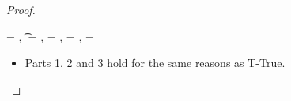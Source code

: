 \begin{lemma}
\begin{enumerate}
\begin{proof}
\begin{case}[T-Subsume]

\end{case}

\begin{case}[T-Const]\e{} = {\const{}},
  \t{} = {\constanttype{\const{}}},
{\thenprop{\prop{}}} = {\topprop{}},
{\elseprop{\prop{}}} = {\botprop{}},
{\object{}} = {\emptyobject{}}

  \begin{itemize}
    \item[] 
      \begin{subcase}[B-Val]
        Parts 1, 2 and 3 hold for the same reasons as T-True. 
      \end{subcase}
  \end{itemize}
\end{case}

\end{proof}

\end{enumerate}
\end{lemma}
